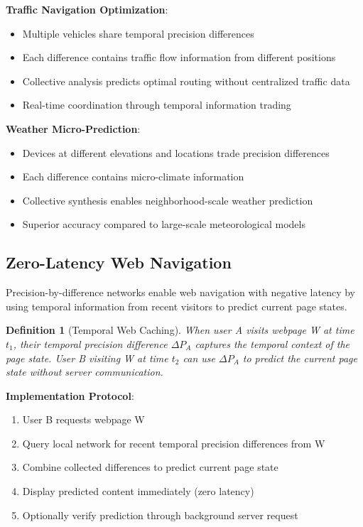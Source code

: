 \documentclass[12pt,a4paper]{article}
\newtheorem{definition}[theorem]{Definition}
\begin{document}
\textbf{Traffic Navigation Optimization}:
\begin{itemize}
\item Multiple vehicles share temporal precision differences
\item Each difference contains traffic flow information from different positions
\item Collective analysis predicts optimal routing without centralized traffic data
\item Real-time coordination through temporal information trading
\end{itemize}

\textbf{Weather Micro-Prediction}:
\begin{itemize}
\item Devices at different elevations and locations trade precision differences
\item Each difference contains micro-climate information
\item Collective synthesis enables neighborhood-scale weather prediction
\item Superior accuracy compared to large-scale meteorological models
\end{itemize}

\subsection{Zero-Latency Web Navigation}

Precision-by-difference networks enable web navigation with negative latency by using temporal information from recent visitors to predict current page states.

\begin{definition}[Temporal Web Caching]
When user A visits webpage W at time $t_1$, their temporal precision difference $\Delta P_A$ captures the temporal context of the page state. User B visiting W at time $t_2$ can use $\Delta P_A$ to predict the current page state without server communication.
\end{definition}

\textbf{Implementation Protocol}:
\begin{enumerate}
\item User B requests webpage W
\item Query local network for recent temporal precision differences from W
\item Combine collected differences to predict current page state
\item Display predicted content immediately (zero latency)
\item Optionally verify prediction through background server request
\end{enumerate}
\end{document}
